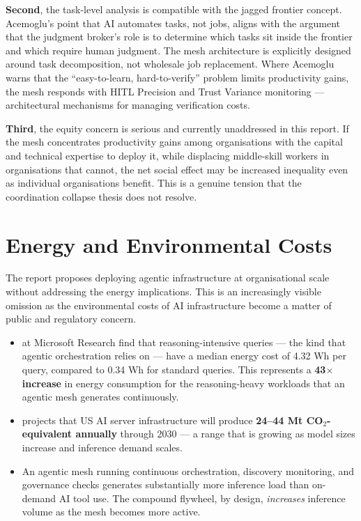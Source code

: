 \textbf{Second}, the task-level analysis is compatible with the jagged frontier concept. Acemoglu's point that AI automates tasks, not jobs, aligns with the argument that the judgment broker's role is to determine which tasks sit inside the frontier and which require human judgment. The mesh architecture is explicitly designed around task decomposition, not wholesale job replacement. Where Acemoglu warns that the ``easy-to-learn, hard-to-verify'' problem limits productivity gains, the mesh responds with HITL Precision and Trust Variance monitoring --- architectural mechanisms for managing verification costs.

\textbf{Third}, the equity concern is serious and currently unaddressed in this report. If the mesh concentrates productivity gains among organisations with the capital and technical expertise to deploy it, while displacing middle-skill workers in organisations that cannot, the net social effect may be increased inequality even as individual organisations benefit. This is a genuine tension that the coordination collapse thesis does not resolve.

\section{Energy and Environmental Costs}

The report proposes deploying agentic infrastructure at organisational scale without addressing the energy implications. This is an increasingly visible omission as the environmental costs of AI infrastructure become a matter of public and regulatory concern.

\begin{evidencebox}[title={The Energy Cost of Agentic Systems}]
\begin{itemize}
  \item \textcite{Patterson2025} at Microsoft Research find that reasoning-intensive queries --- the kind that agentic orchestration relies on --- have a median energy cost of 4.32 Wh per query, compared to 0.34 Wh for standard queries. This represents a \textbf{43$\times$ increase} in energy consumption for the reasoning-heavy workloads that an agentic mesh generates continuously.
  \item \textcite{NatureSustainability2025} projects that US AI server infrastructure will produce \textbf{24--44 Mt CO$_2$-equivalent annually} through 2030 --- a range that is growing as model sizes increase and inference demand scales.
  \item An agentic mesh running continuous orchestration, discovery monitoring, and governance checks generates substantially more inference load than on-demand AI tool use. The compound flywheel, by design, \emph{increases} inference volume as the mesh becomes more active.
\end{itemize}
\end{evidencebox}

